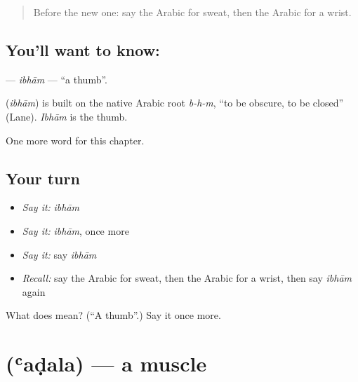 \label{lesson:AR-C263-ibham}



\begin{quote}
Before the new one: say the Arabic for sweat, then the Arabic for a wrist.
\end{quote}

\subsection*{You'll want to know: }
\textbf{} — \emph{ibhām} — \textquotedblleft{}a thumb\textquotedblright{}.

\begin{cousinweb}
\textbf{} (\emph{ibhām}) is built on the native Arabic root \emph{b-h-m}, \textquotedblleft{}to be obscure, to be closed\textquotedblright{} (Lane). \emph{Ibhām} is the thumb.
\end{cousinweb}

\begin{grammarlens}[title={What you've built}]
One more word for this chapter.
\end{grammarlens}

\subsection*{Your turn}
\begin{itemize}
\raggedright
  \item \emph{Say it:} \emph{ibhām}
  \item \emph{Say it:} \emph{ibhām}, once more
  \item \emph{Say it:} say \emph{ibhām}
  \item \emph{Recall:} say the Arabic for sweat, then the Arabic for a wrist, then say \emph{ibhām} again
\end{itemize}

\begin{tcolorbox}[breakable,colback=teal!4,colframe=teal!35!black,title={Before you move on}]
What does  mean? (\textquotedblleft{}A thumb\textquotedblright{}.) Say it once more.
\end{tcolorbox}
\section[\texorpdfstring{\ar{عضلة} (ʿaḍala)}{عضلة (ʿaḍala)}]{ (ʿaḍala) — a muscle}

\label{lesson:AR-C263-adala}



